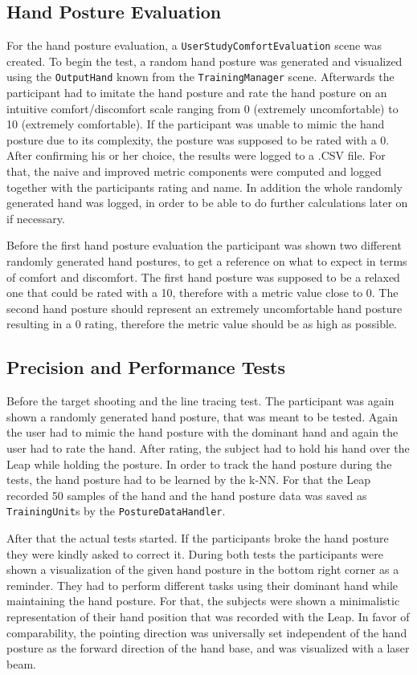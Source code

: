\subsection{Hand Posture Evaluation}

For the hand posture evaluation, a \texttt{UserStudyComfortEvaluation} scene was created. To begin the test, a random hand posture was generated and visualized using the \texttt{OutputHand} known from the \texttt{TrainingManager} scene. Afterwards the participant had to imitate the hand posture and rate the hand posture on an intuitive comfort/discomfort scale ranging from 0 (extremely uncomfortable) to 10 (extremely comfortable). If the participant was unable to mimic the hand posture due to its complexity, the posture was supposed to be rated with a 0. After confirming his or her choice, the results were logged to a .CSV file. For that, the naive and improved metric components were computed and logged together with the participants rating and name. In addition the whole randomly generated hand was logged, in order to be able to do further calculations later on if necessary.

Before the first hand posture evaluation the participant was shown two different randomly generated hand postures, to get a reference on what to expect in terms of comfort and discomfort. The first hand posture was supposed to be a relaxed one that could be rated with a 10, therefore with a metric value close to 0. The second hand posture should represent an extremely uncomfortable hand posture resulting in a 0 rating, therefore the metric value should be as high as possible.

\subsection{Precision and Performance Tests}

Before the target shooting and the line tracing test. The participant was again shown a randomly generated hand posture, that was meant to be tested. Again the user had to mimic the hand posture with the dominant hand and again the user had to rate the hand. After rating, the subject had to hold his hand over the Leap while holding the posture. In order to track the hand posture during the tests, the hand posture had to be learned by the k-NN. For that the Leap recorded 50 samples of the hand and the hand posture data was saved as \texttt{TrainingUnit}s by the \texttt{PostureDataHandler}. 

After that the actual tests started. If the participants broke the hand posture they were kindly asked to correct it. During both tests the participants were shown a visualization of the given hand posture in the bottom right corner as a reminder. They had to perform different tasks using their dominant hand while maintaining the hand posture. 
For that, the subjects were shown a minimalistic representation of their hand position that was recorded with the Leap. In favor of comparability, the pointing direction was universally set independent of the hand posture as the forward direction of the hand base, and was visualized with a laser beam. 

